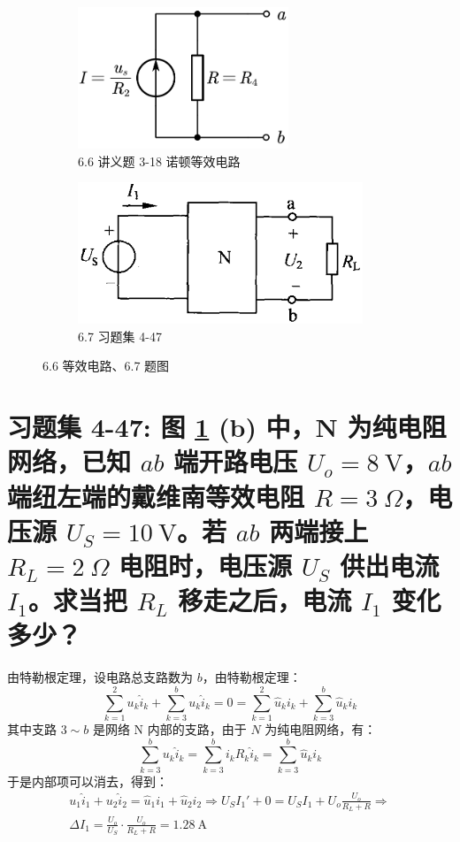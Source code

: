 \documentclass[UTF8]{report}
\theoremstyle{MyLineTheoremStyle} %
\theoremstyle{MyBlockTheoremStyle} %
\theoremstyle{MySubsubsectionStyle} %
\begin{document}
\begin{figure}[H]\centering
\begin{subfigure}[t]{0.5\columnwidth}\centering
    \includegraphics[height=120pt]{assets/6/9d53a9b244bf76e6ad1734869043135a.png}
    \caption{ 6.6 讲义题 3-18 诺顿等效电路 }
\end{subfigure}\hfill
\begin{subfigure}[t]{0.5\columnwidth}\centering
    \includegraphics[height=120pt]{assets/6/2e96a177467ade2ca35ed590fb9751d7.png}
    \caption{ 6.7 习题集 4-47 }
\end{subfigure}
\caption{ 6.6 等效电路、6.7 题图 }\label{6.6 等效电路、6.7 题图}
\end{figure}

\section{习题集 4-47: 图 \ref{6.6 等效电路、6.7 题图} (b) 中，N 为纯电阻网络，已知 $ab$ 端开路电压 $U_o = 8 \ \mathrm{V}$，$ab$ 端纽左端的戴维南等效电阻 $R = 3 \ \Omega$，电压源 $U_S = 10 \ \mathrm{V}$。若 $ab$ 两端接上 $R_L = 2 \ \Omega$ 电阻时，电压源 $U_S$ 供出电流 $I_1$。求当把 $R_L$ 移走之后，电流 $I_1$ 变化多少？} 

由特勒根定理，设电路总支路数为 $b$，由特勒根定理：
\begin{equation}
\sum_{k = 1}^{2} u_k \hat{i}_k + \sum_{k = 3}^{b} u_k \hat{i}_k =  0 = \sum_{k = 1}^{2} \hat{u}_k i_k + \sum_{k = 3}^{b} \hat{u}_k i_k 
\end{equation}
其中支路 $3 \sim b$ 是网络 N 内部的支路，由于 $N$ 为纯电阻网络，有：
\begin{equation}
    \sum_{k = 3}^{b} u_k \hat{i}_k  = \sum_{k = 3}^{b} i_k R_k \hat{i}_k =  \sum_{k = 3}^{b} \hat{u}_k i_k 
\end{equation}
于是内部项可以消去，得到：
\begin{gather}
    u_1\hat{i}_1 + u_2 \hat{i}_2 = \hat{u}_1i_1 + \hat{u}_2 i_2 \Longrightarrow 
U_S I_1' + 0 = U_SI_1 + U_o \frac{U_o}{R_L + R}
\Longrightarrow \\
\boxed{
    \Delta I_1 = \frac{U_o}{U_S}\cdot\frac{U_o}{R_L + R} = 1.28 \ \mathrm{A}
}
\end{gather}
\end{document}
